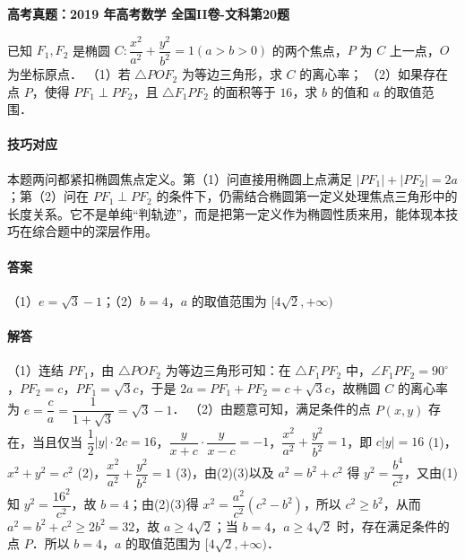 \documentclass[UTF8,a4paper,11pt]{ctexart}
\newenvironment{gaokao}[1]{\par\medskip\noindent\textbf{高考真题：#1}\par\smallskip}{\par\medskip}
\begin{document}
\begin{gaokao}{2019 年高考数学 全国II卷-文科第20题}

已知 $F_1,F_2$ 是椭圆 $C:\dfrac{x^2}{a^2}+\dfrac{y^2}{b^2}=1(a>b>0)$ 的两个焦点，$P$ 为 $C$ 上一点，$O$ 为坐标原点．
（1）若 $\triangle POF_2$ 为等边三角形，求 $C$ 的离心率；
（2）如果存在点 $P$，使得 $PF_1\perp PF_2$，且 $\triangle F_1PF_2$ 的面积等于 $16$，求 $b$ 的值和 $a$ 的取值范围．

\begin{center}


\end{center}

\paragraph{技巧对应}

本题两问都紧扣椭圆焦点定义。第（1）问直接用椭圆上点满足 $|PF_1|+|PF_2|=2a$；第（2）问在 $PF_1\perp PF_2$ 的条件下，仍需结合椭圆第一定义处理焦点三角形中的长度关系。它不是单纯“判轨迹”，而是把第一定义作为椭圆性质来用，能体现本技巧在综合题中的深层作用。

\paragraph{答案}

（1）$e=\sqrt{3}-1$；（2）$b=4$，$a$ 的取值范围为 $[4\sqrt{2},+\infty)$

\paragraph{解答}

（1）连结 $PF_1$，由 $\triangle POF_2$ 为等边三角形可知：在 $\triangle F_1PF_2$ 中，$\angle F_1PF_2=90^\circ$，$PF_2=c$，$PF_1=\sqrt{3}c$，于是 $2a=PF_1+PF_2=c+\sqrt{3}c$，故椭圆 $C$ 的离心率为 $e=\dfrac{c}{a}=\dfrac{1}{1+\sqrt{3}}=\sqrt{3}-1$．
（2）由题意可知，满足条件的点 $P(x,y)$ 存在，当且仅当 $\dfrac{1}{2}|y|\cdot2c=16$，$\dfrac{y}{x+c}\cdot\dfrac{y}{x-c}=-1$，$\dfrac{x^2}{a^2}+\dfrac{y^2}{b^2}=1$，即 $c|y|=16$ (1)，$x^2+y^2=c^2$ (2)，$\dfrac{x^2}{a^2}+\dfrac{y^2}{b^2}=1$ (3)，由(2)(3)以及 $a^2=b^2+c^2$ 得 $y^2=\dfrac{b^4}{c^2}$，又由(1)知 $y^2=\dfrac{16^2}{c^2}$，故 $b=4$；由(2)(3)得 $x^2=\dfrac{a^2}{c^2}(c^2-b^2)$，所以 $c^2\ge b^2$，从而 $a^2=b^2+c^2\ge 2b^2=32$，故 $a\ge 4\sqrt{2}$；当 $b=4$，$a\ge 4\sqrt{2}$ 时，存在满足条件的点 $P$．所以 $b=4$，$a$ 的取值范围为 $[4\sqrt{2},+\infty)$．


\end{gaokao}
\end{document}
